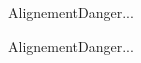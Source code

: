 \documentclass[10pt,a4paper]{article}
\begin{document}
Alignement\danger{}Danger...

Alignement\raisebox{\depth}{\danger}Danger...
\end{document}
